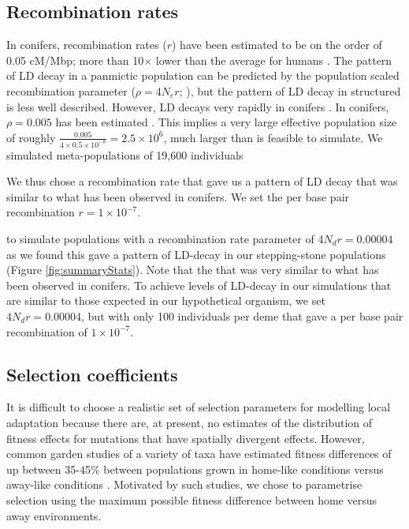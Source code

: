 \documentclass[10pt,twoside,lineno, twocolumn]{GSA_format}
\begin{document}
\subsection{Recombination rates}
In conifers, recombination rates ($r$) have been estimated to be on the order of 0.05 cM/Mbp; more than 10$\times$ lower than the average for humans \citep{Stapley2017}. The pattern of LD decay in a panmictic population can be predicted by the population scaled recombination parameter ($\rho = 4N_er$; \citealt{RN173}), but the pattern of LD decay in structured is less well described. However, LD decays very rapidly in conifers \citep{Pavy2012}. In conifers, $\rho = 0.005$ has been estimated \citep{Pavy2012}. This implies a very large effective population size of roughly $\frac{0.005}{4\times0.5\times10^{-8}} = 2.5 \times 10^6$, much larger than is feasible to simulate. We simulated meta-populations of 19,600 individuals 

We thus chose a recombination rate that gave us a pattern of LD decay that was similar to what has been observed in conifers. We set the per base pair recombination $r = 1 \times 10^{-7}$.

to simulate populations with a recombination rate parameter of $4N_dr = 0.00004$ as we found this gave a pattern of LD-decay in our stepping-stone populations (Figure \ref{fig:summaryStats}). Note that the 
	that was very similar to what has been observed in conifers. To achieve levels of LD-decay in our simulations that are similar to those expected in our hypothetical organism, we set $4N_dr = 0.00004$, but with only 100 individuals per deme that gave a per base pair recombination of $1 \times 10^{-7}$.

\subsection{Selection coefficients} 

It is difficult to choose a realistic set of selection parameters for modelling local adaptation because there are, at present, no estimates of the distribution of fitness effects for mutations that have spatially divergent effects. However, common garden studies of a variety of taxa have estimated fitness differences of up between 35-45\% between populations grown in home-like conditions versus away-like conditions \citep{Hereford2009, Bontrager2020}. Motivated by such studies, we chose to parametrise selection using the maximum possible fitness difference between home versus away environments.\\
\end{document}
